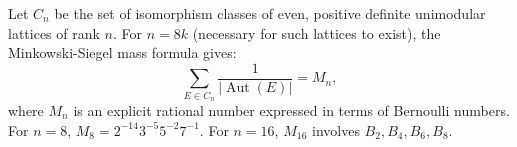 Let $C_n$ be the set of isomorphism classes of even, positive definite unimodular lattices of rank $n$. For $n = 8k$ (necessary for such lattices to exist), the Minkowski-Siegel mass formula gives:
$$
\sum_{E \in C_n} \frac{1}{|\operatorname{Aut}(E)|} = M_n,
$$
where $M_n$ is an explicit rational number expressed in terms of Bernoulli numbers. For $n=8$, $M_8 = 2^{-14}3^{-5}5^{-2}7^{-1}$. For $n=16$, $M_{16}$ involves $B_2, B_4, B_6, B_8$.
